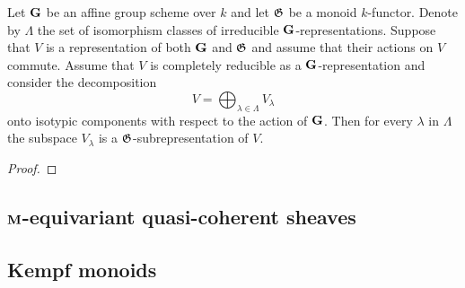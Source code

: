 \begin{proposition}\label{proposition:commuting_action_preserves_isotypic_decomposition}
Let $\mathbf{G}$ be an affine group scheme over $k$ and let ${\mathfrak G}$ be a monoid $k$-functor. Denote by $\Lambda$ the set of isomorphism classes of irreducible $\mathbf{G}$-representations. Suppose that $V$ is a representation of both $\mathbf{G}$ and ${\mathfrak G}$ and assume that their actions on $V$ commute. Assume that $V$ is completely reducible as a $\mathbf{G}$-representation and consider the decomposition
$$V = \bigoplus_{\lambda\in \Lambda}V_{\lambda}$$
onto isotypic components with respect to the action of $\mathbf{G}$. Then for every $\lambda$ in $\Lambda$ the subspace $V_{\lambda}$ is a ${\mathfrak G}$-subrepresentation of $V$.
\end{proposition}
\begin{proof}
\end{proof}

\subsection{$\mathbf{M}$-equivariant quasi-coherent sheaves}

\subsection{Kempf monoids}

